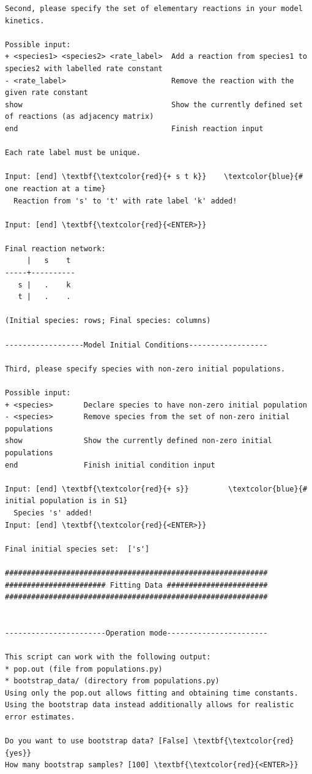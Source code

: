 \documentclass[a4paper,11pt,DIV=15,openany]{scrbook}
\begin{document}
\begin{oframed}
\begin{Verbatim}[commandchars=\\\{\}]
Second, please specify the set of elementary reactions in your model kinetics.

Possible input:
+ <species1> <species2> <rate_label>  Add a reaction from species1 to species2 with labelled rate constant
- <rate_label>                        Remove the reaction with the given rate constant
show                                  Show the currently defined set of reactions (as adjacency matrix)
end                                   Finish reaction input

Each rate label must be unique.

Input: [end] \textbf{\textcolor{red}{+ s t k}}    \textcolor{blue}{# one reaction at a time}
  Reaction from 's' to 't' with rate label 'k' added!

Input: [end] \textbf{\textcolor{red}{<ENTER>}}

Final reaction network:
     |   s    t 
-----+----------
   s |   .    k 
   t |   .    . 

(Initial species: rows; Final species: columns)

------------------Model Initial Conditions------------------

Third, please specify species with non-zero initial populations.

Possible input:
+ <species>       Declare species to have non-zero initial population
- <species>       Remove species from the set of non-zero initial populations
show              Show the currently defined non-zero initial populations
end               Finish initial condition input

Input: [end] \textbf{\textcolor{red}{+ s}}         \textcolor{blue}{# initial population is in S1}
  Species 's' added!
Input: [end] \textbf{\textcolor{red}{<ENTER>}}

Final initial species set:  ['s']

############################################################
####################### Fitting Data #######################
############################################################


-----------------------Operation mode-----------------------

This script can work with the following output:
* pop.out (file from populations.py)
* bootstrap_data/ (directory from populations.py)
Using only the pop.out allows fitting and obtaining time constants.
Using the bootstrap data instead additionally allows for realistic error estimates.

Do you want to use bootstrap data? [False] \textbf{\textcolor{red}{yes}}
How many bootstrap samples? [100] \textbf{\textcolor{red}{<ENTER>}}



\end{Verbatim}
\end{oframed}
\end{document}

